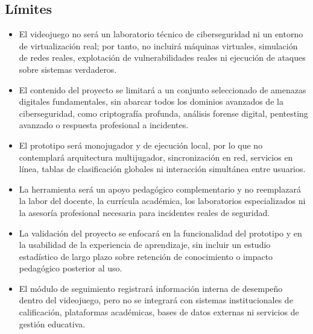 \subsection{Límites}

\begin{itemize}
  \item El videojuego no será un laboratorio técnico de ciberseguridad ni un entorno de virtualización real; por tanto, no incluirá máquinas virtuales, simulación de redes reales, explotación de vulnerabilidades reales ni ejecución de ataques sobre sistemas verdaderos.
  \item El contenido del proyecto se limitará a un conjunto seleccionado de amenazas digitales fundamentales, sin abarcar todos los dominios avanzados de la ciberseguridad, como criptografía profunda, análisis forense digital, pentesting avanzado o respuesta profesional a incidentes.
  \item El prototipo será monojugador y de ejecución local, por lo que no contemplará arquitectura multijugador, sincronización en red, servicios en línea, tablas de clasificación globales ni interacción simultánea entre usuarios.
  \item La herramienta será un apoyo pedagógico complementario y no reemplazará la labor del docente, la currícula académica, los laboratorios especializados ni la asesoría profesional necesaria para incidentes reales de seguridad.
  \item La validación del proyecto se enfocará en la funcionalidad del prototipo y en la usabilidad de la experiencia de aprendizaje, sin incluir un estudio estadístico de largo plazo sobre retención de conocimiento o impacto pedagógico posterior al uso.
  \item El módulo de seguimiento registrará información interna de desempeño dentro del videojuego, pero no se integrará con sistemas institucionales de calificación, plataformas académicas, bases de datos externas ni servicios de gestión educativa.
\end{itemize}
